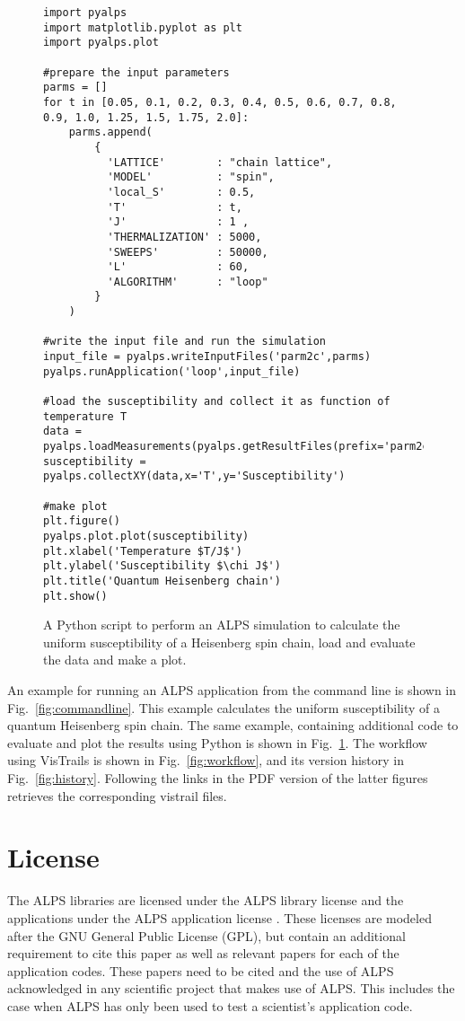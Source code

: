 \documentclass[12pt]{iopart}
\begin{document}
\begin{figure}
\begin{tiny}
\begin{center}
\begin{verbatim}
import pyalps
import matplotlib.pyplot as plt
import pyalps.plot

#prepare the input parameters
parms = []
for t in [0.05, 0.1, 0.2, 0.3, 0.4, 0.5, 0.6, 0.7, 0.8, 0.9, 1.0, 1.25, 1.5, 1.75, 2.0]:
    parms.append(
        { 
          'LATTICE'        : "chain lattice", 
          'MODEL'          : "spin",
          'local_S'        : 0.5,
          'T'              : t,
          'J'              : 1 ,
          'THERMALIZATION' : 5000,
          'SWEEPS'         : 50000,
          'L'              : 60,
          'ALGORITHM'      : "loop"
        }
    )

#write the input file and run the simulation
input_file = pyalps.writeInputFiles('parm2c',parms)
pyalps.runApplication('loop',input_file)

#load the susceptibility and collect it as function of temperature T
data = pyalps.loadMeasurements(pyalps.getResultFiles(prefix='parm2c'),'Susceptibility')
susceptibility = pyalps.collectXY(data,x='T',y='Susceptibility')

#make plot
plt.figure()
pyalps.plot.plot(susceptibility)
plt.xlabel('Temperature $T/J$')
plt.ylabel('Susceptibility $\chi J$')
plt.title('Quantum Heisenberg chain')
plt.show()
\end{verbatim}
\end{center}
\end{tiny}
\caption{A Python script to perform an ALPS simulation to calculate the uniform susceptibility of a Heisenberg spin chain, load and evaluate the data and make a plot. }
\label{fig:python}
\end{figure}

An example for running an ALPS application from the command line is shown in Fig.~\ref{fig:commandline}. This example calculates the uniform susceptibility of a quantum Heisenberg spin chain. The same example, containing additional code to evaluate and plot the results  using Python is shown in Fig.~\ref{fig:python}. The workflow using VisTrails is shown in Fig.~\ref{fig:workflow}, and its version history in Fig.~\ref{fig:history}. Following the links in the PDF version of the latter figures retrieves the corresponding vistrail files.

\section{License}
The ALPS libraries are licensed under the ALPS library license \cite{librarylicense} and the applications under the ALPS application license  \cite{applicationlicense}. These licenses are modeled after the GNU General Public License (GPL), but contain an additional requirement to cite this paper as well as relevant papers for each of the application codes. These papers need to be cited and the use of ALPS acknowledged in any scientific project that makes use of ALPS. This includes the case when ALPS has only been used to test a scientist's application code.
\end{document}
